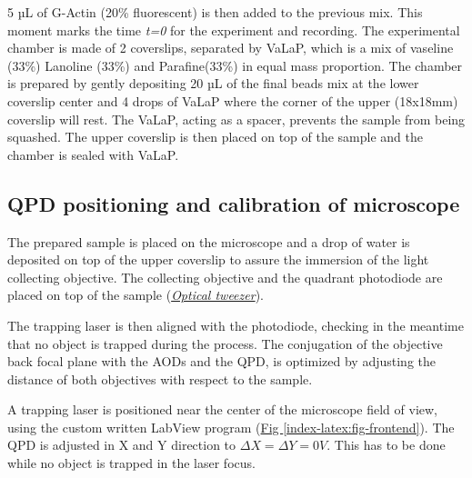 \documentclass[A4paperpaper,11pt,english]{sphinxmanual}
\begin{document}
5 µL of G-Actin (20\% fluorescent) is then added to the previous mix. This
moment marks the time \emph{t=0} for the experiment and recording. The experimental chamber is
made of 2 coverslips, separated by VaLaP, which is a mix of vaseline (33\%)
Lanoline (33\%) and Parafine(33\%) in equal mass proportion. The chamber is prepared by gently depositing 20 µL of
the final beads mix at the lower coverslip center and 4 drops of VaLaP
where the corner of the upper (18x18mm) coverslip
will rest. The VaLaP, acting as a spacer, prevents the sample from being squashed.  The
upper coverslip is then placed on top of the sample and the chamber is sealed
with VaLaP.


\subsection{QPD positioning and calibration of microscope}
\label{index-latex:laser-calibration}\label{index-latex:qpd-positioning-and-calibration-of-microscope}
The prepared sample is placed on the microscope and a drop of water is
deposited on top of the upper coverslip to assure  the immersion of the light
collecting objective. The collecting objective and the quadrant photodiode are
placed on top of the sample ({\hyperref[index-latex:optical-tweezer]{\emph{Optical tweezer}}}).

The trapping laser is then aligned with the photodiode, checking in the meantime that no
object is trapped during the process. The conjugation of the objective back focal plane
with the AODs and the QPD, is optimized by adjusting the
distance of both objectives with respect to the sample.

A trapping laser is positioned near the center of the microscope field of view,
using the custom written LabView program (\hyperref[index-latex:fig-frontend]{Fig  \ref*{index-latex:fig-frontend}}). The QPD is adjusted in X and Y direction to
\(\Delta X  = \Delta Y = 0V\). This has to be  done while no object is trapped in
the  laser focus.
\end{document}
